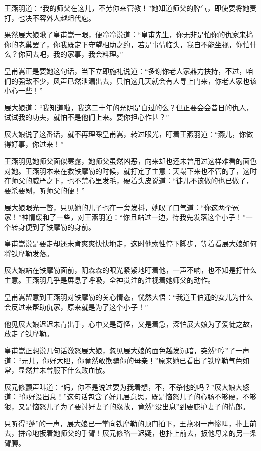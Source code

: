 \documentclass[12pt,oneside]{book}
\begin{document}
王燕羽道：``我的师父在这儿，不劳你来管教！''她知道师父的脾气，即使要将她责打，也决不容外人越俎代庖。

果然展大娘瞅了皇甫嵩一眼，便冷冷说道：``皇甫先生，你无非是怕你的仇家来捣你的老巢罢了，你我既定下守望相助之约，若是事情临头，我自不能坐视，你怕什么？你回去吧，我的家事，我会料理。''

皇甫嵩正是要她这句话，当下立即施礼说道：``多谢你老人家鼎力扶持，不过，咱们的强敌不少，风声已然泄漏出去，只怕这几天就会有人寻上门来，你老人家也该小心一些！''

展大娘道：``我知道啦，我这二十年的光阴是白过的么？但正要会会昔日的仇人，试试我的功夫，就怕不是他们上来。要你担心作甚？''

展大娘说了这番话，就不再理睬皇甫嵩，转过眼光，盯着王燕羽道：``燕儿，你做得好事，你过来！''

王燕羽见她师父面似寒露，她师父虽然凶恶，向来却也还未曾用过这样难看的面色对她。王燕羽本来在救铁摩勒的时候，就打定了主意：天塌下来也不管的了，这时在师父的威严之下，也不禁心里发毛，硬着头皮说道：``徒儿不该做的也已做了，要杀要剐，听师父的便！''

展大娘眼光一瞥，只见她的儿子也在一旁发抖，她叹了口气道：``你这两个冤家！''神情缓和了一些，对王燕羽道：``你且站过一边，待我先发落这个小子！''一个转身便到了铁摩勒的身前。

皇甫嵩说是要走却还未肯爽爽快快地走，这时他索性停下脚步，等着看展大娘如何将铁摩勒发落。

展大娘站在铁摩勒面前，阴森森的眼光紧紧地盯着他，一声不响，也不知是打什么主意。王燕羽几乎是屏息了呼吸，全神贯注的注视着她师父的动作。

皇甫嵩留意到王燕羽对铁摩勒的关心情态，恍然大悟：``我道王伯通的女儿为什么会反过来帮助仇家，原来就是为了这个小子！''

他见展大娘迟迟未肯出手，心中又是奇怪，又是着急，深怕展大娘为了爱徒之故，放走了铁摩勒。

皇甫嵩正想说几句话激怒展大娘，忽见展大娘的面色越发沉暗，突然``哼''了一声道：``元儿，你好大胆，你竟然敢欺骗你的母亲！''原来她已看出了铁摩勒气色如常，显然并未曾服下什么败血散。

展元修颤声叫道：``妈，你不是说过要为我着想，不，不杀他的吗？''展大娘大怒道：``你好没出息！''这句话包含了好几层意思，既是恼怒儿子的心肠不够硬，不够狠，又是恼怒儿子为了要讨好妻子的缘故，竟然``没出息''到要庇护妻子的情郎。

只听得``蓬''的一声，展大娘已一掌向铁摩勒的顶门拍下，王燕羽一声惨叫，扑上前去，拼命地扳着她师父的手臂！展元修略一迟疑，也扑上前去，扳他母亲的另一条臂膊。
\end{document}

